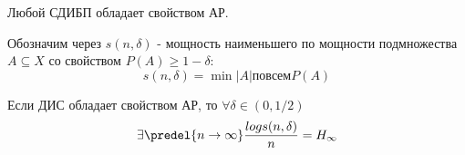 \begin{proofs}[1-я т. Шеннона]
Любой СДИБП обладает свойством АР.
\end{proofs}

\begin{defs}
Обозначим через $s(n, \delta)$ - мощность наименьшего по мощности подмножества $A \subseteq X$ со свойством $P(A) \geq 1-\delta:$
$$s(n,\delta) = \min|A| по всем P(A)$$ 
\end{defs}

\begin{proofs}[2-я т. Шеннона]
Если ДИС обладает свойством АР, то $\forall \delta \in (0, 1/2) $
$$\exists \predel{n \rightarrow \infty} \frac{log s(n, \delta)} {n} = H_{\infty}$$
\end{proofs}

\newpage
